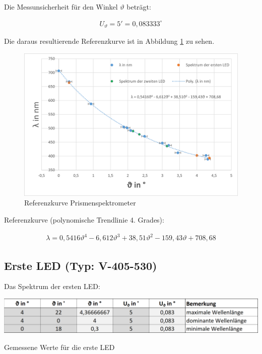 \documentclass[a4paper]{scrartcl}
\numberwithin{equation}{subsection}
\begin{document}
Die Messunsicherheit für den Winkel $\vartheta$ beträgt:

\begin{align*}
	U_\vartheta = 5' = 0,083333^\circ
\end{align*}

Die daraus resultierende Referenzkurve ist in Abbildung \ref{fig:Diagramm} zu sehen.

\begin{figure}[H]
	\includegraphics[width=14cm]{Abbildungen/Diagramm}
	\centering
	\caption{Referenzkurve Prismenspektrometer}
	\centering
	\label{fig:Diagramm}
\end{figure}
\newpage
Referenzkurve (polynomische Trendlinie 4. Grades):

\begin{align*}
	\lambda = 0,5416\vartheta^4 - 6,612\vartheta^3 + 38,51\vartheta^2 -159,43\vartheta + 708,68
\end{align*}

\subsection{Erste LED (Typ: V-405-530)}
Das Spektrum der ersten LED:

\begin{table}[H]
	\includegraphics[width=14cm]{Abbildungen/MesswerteLED1}
	\centering
	\caption{Gemessene Werte für die erste LED}
	\centering
	\label{tab:MesswerteLED1}
\end{table}
\end{document}
